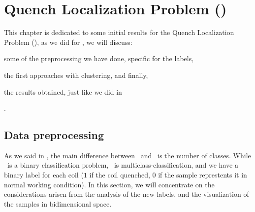 \chapter{Quench Localization Problem (\qlp)}
\label{chp:qlp}
This chapter is dedicated to some initial results for the Quench Localization Problem (\qlp), as we did for \qrp,
we will discuss:
\begin{inparaenum}[(i)]
	\item some of the preprocessing we have done, specific for the labels,
	\item the first approaches with clustering, and finally,
	\item the results obtained, just like we did in 
\end{inparaenum}.
\section{Data preprocessing}
\label{sec:qlp-preprocessing}
As we said in , the main difference between \qlp\ and \qrp\ is the number of
classes. While \qrp\ is a binary classification problem, \qlp\ is multiclass-classification, and we
have a binary label for each coil ($1$ if the coil quenched, $0$ if the sample represtents it in
normal working condition). In this section, we will concentrate on the considerations arisen from the analysis
of the new labels, and the visualization of the samples in bidimensional space.

